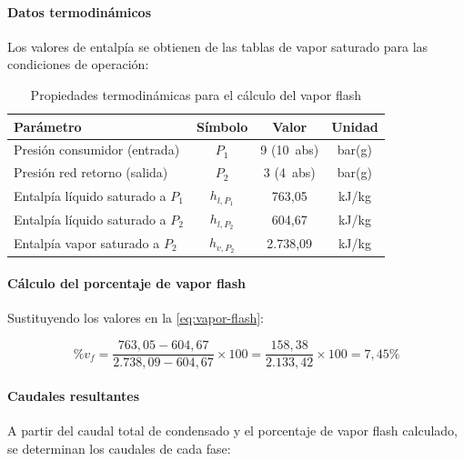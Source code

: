 \documentclass[12pt]{article}
\begin{document}
\paragraph{Datos termodinámicos}

Los valores de entalpía se obtienen de las tablas de vapor saturado para las condiciones de operación:

\begin{table}[H]
	\centering
	\caption{Propiedades termodinámicas para el cálculo del vapor flash}
	\label{tab:propiedades-flash}
	\begin{tabular}{lccc}
		\toprule
		\textbf{Parámetro}                & \textbf{Símbolo} & \textbf{Valor} & \textbf{Unidad} \\
		\midrule
		Presión consumidor (entrada)      & $P_1$            & 9 (10~abs)     & bar(g)          \\
		Presión red retorno (salida)      & $P_2$            & 3 (4~abs)      & bar(g)          \\
		Entalpía líquido saturado a $P_1$ & $h_{l,P_1}$      & 763{,}05       & kJ/kg           \\
		Entalpía líquido saturado a $P_2$ & $h_{l,P_2}$      & 604{,}67       & kJ/kg           \\
		Entalpía vapor saturado a $P_2$   & $h_{v,P_2}$      & 2.738{,}09     & kJ/kg           \\
		\bottomrule
	\end{tabular}
\end{table}

\paragraph{Cálculo del porcentaje de vapor flash}

Sustituyendo los valores en la \autoref{eq:vapor-flash}:

\begin{equation}
	\%v_f = \frac{763{,}05 - 604{,}67}{2.738{,}09 - 604{,}67} \times 100 = \frac{158{,}38}{2.133{,}42} \times 100 = 7{,}45\%
	\label{eq:vapor-flash-resultado}
\end{equation}

\paragraph{Caudales resultantes}

A partir del caudal total de condensado y el porcentaje de vapor flash calculado, se determinan los caudales de cada fase:
\end{document}
